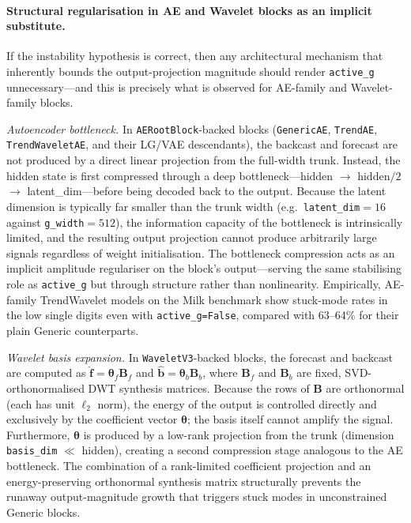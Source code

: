 \documentclass[11pt,a4paper]{article}
\begin{document}
\paragraph{Structural regularisation in AE and Wavelet blocks as an implicit substitute.}
If the instability hypothesis is correct, then any architectural mechanism that inherently bounds the output-projection magnitude should render \texttt{active\_g} unnecessary---and this is precisely what is observed for AE-family and Wavelet-family blocks.

\emph{Autoencoder bottleneck.} In \texttt{AERootBlock}-backed blocks (\texttt{GenericAE}, \texttt{TrendAE}, \texttt{TrendWaveletAE}, and their LG/VAE descendants), the backcast and forecast are not produced by a direct linear projection from the full-width trunk. Instead, the hidden state is first compressed through a deep bottleneck---hidden $\to$ hidden$/2$ $\to$ latent\_dim---before being decoded back to the output. Because the latent dimension is typically far smaller than the trunk width (e.g.\ \texttt{latent\_dim}$=16$ against \texttt{g\_width}$=512$), the information capacity of the bottleneck is intrinsically limited, and the resulting output projection cannot produce arbitrarily large signals regardless of weight initialisation. The bottleneck compression acts as an implicit amplitude regulariser on the block's output---serving the same stabilising role as \texttt{active\_g} but through structure rather than nonlinearity. Empirically, AE-family TrendWavelet models on the Milk benchmark show stuck-mode rates in the low single digits even with \texttt{active\_g=False}, compared with 63--64\% for their plain Generic counterparts.

\emph{Wavelet basis expansion.} In \texttt{WaveletV3}-backed blocks, the forecast and backcast are computed as $\hat{\mathbf{f}} = \boldsymbol{\theta}_f \mathbf{B}_f$ and $\hat{\mathbf{b}} = \boldsymbol{\theta}_b \mathbf{B}_b$, where $\mathbf{B}_f$ and $\mathbf{B}_b$ are fixed, SVD-orthonormalised DWT synthesis matrices. Because the rows of $\mathbf{B}$ are orthonormal (each has unit $\ell_2$ norm), the energy of the output is controlled directly and exclusively by the coefficient vector $\boldsymbol{\theta}$; the basis itself cannot amplify the signal. Furthermore, $\boldsymbol{\theta}$ is produced by a low-rank projection from the trunk (dimension \texttt{basis\_dim} $\ll$ hidden), creating a second compression stage analogous to the AE bottleneck. The combination of a rank-limited coefficient projection and an energy-preserving orthonormal synthesis matrix structurally prevents the runaway output-magnitude growth that triggers stuck modes in unconstrained Generic blocks.
\end{document}
